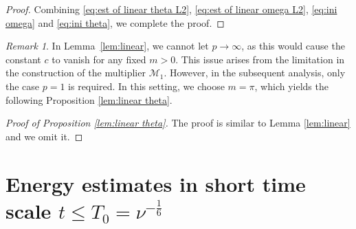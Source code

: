 \documentclass[reqno, 12pt]{amsart} %
\theoremstyle{plain} %
\theoremstyle{definition}
\theoremstyle{remark}
\newtheorem{Rem}[Thm]{Remark}
\numberwithin{equation}{section} %
\begin{document}
\begin{proof}
		Combining \eqref{eq:est of linear theta L2}, \eqref{eq:est of linear omega L2}, \eqref{eq:ini omega} and \eqref{eq:ini theta}, we complete the proof.
	\end{proof}
	\begin{Rem}
		In Lemma~\ref{lem:linear}, we cannot let \( p \to \infty \), as this would cause the constant \( c \) to vanish for any fixed \( m > 0 \). This issue arises from the limitation in the construction of the multiplier \( \mathcal{M}_1 \). However, in the subsequent analysis, only the case \( p = 1 \) is required. In this setting, we  choose \( m = \pi \), which yields the following Proposition \ref{lem:linear theta}.
	\end{Rem}
	
	
	\begin{proof}[Proof of Proposition \ref{lem:linear theta}]
		The proof is similar to Lemma \ref{lem:linear} and we omit it.
	\end{proof}
	
	
	
	\section{Energy estimates in short time scale $t\leq T_0 = \nu^{-\frac16}$} \label{sec.4}
	
\end{document}
